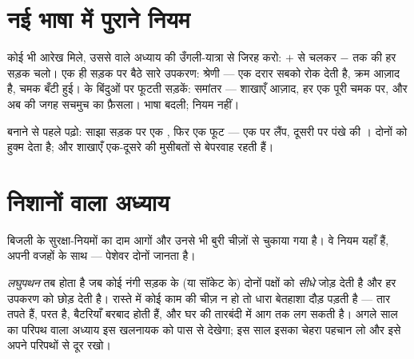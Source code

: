 \section{नई भाषा में पुराने नियम}

\begin{example}[माहिर की तरह आरेख पढ़ना]\label{ex:g6:circuits-and-safety:reading}
कोई भी आरेख मिले, उससे  वाले अध्याय की उँगली-यात्रा से
जिरह करो: $+$ से चलकर $-$ तक की हर सड़क चलो। एक ही सड़क पर बैठे सारे
उपकरण: श्रेणी --- एक दरार सबको रोक देती है, क्रम आज़ाद है, चमक बँटी
हुई।  के बिंदुओं पर फूटती सड़कें: समांतर --- शाखाएँ आज़ाद, हर एक
पूरी चमक पर, और अब  की जगह सचमुच का फ़ैसला। भाषा बदली; नियम
नहीं।
\end{example}

\begin{omfigure}

{\small बनाने से पहले पढ़ो: साझा सड़क पर एक , फिर एक फूट ---
एक  पर लैंप, दूसरी पर पंखे की ।  दोनों को हुक्म देता है;
और शाखाएँ एक-दूसरे की मुसीबतों से बेपरवाह रहती हैं।}
\end{omfigure}

\section{निशानों वाला अध्याय}

बिजली के सुरक्षा-नियमों का दाम आगों और उनसे भी बुरी चीज़ों से चुकाया
गया है। वे नियम यहाँ हैं, अपनी वजहों के साथ --- पेशेवर दोनों जानता है।

\begin{definition}[लघुपथन]\label{def:g6:circuits-and-safety:short}
\emph{लघुपथन} तब होता है जब कोई नंगी  सड़क  के
(या सॉकेट के) दोनों पक्षों को \emph{सीधे} जोड़ देती है और हर उपकरण को
छोड़ देती है। रास्ते में कोई काम की चीज़ न हो तो धारा बेतहाशा दौड़
पड़ती है --- तार तपते हैं,  परत  है, बैटरियाँ बरबाद
होती हैं, और घर की तारबंदी में आग तक लग सकती है। अगले साल का परिपथ वाला
अध्याय इस खलनायक को पास से देखेगा; इस साल इसका चेहरा पहचान लो और इसे
अपने परिपथों से दूर रखो।
\end{definition}

